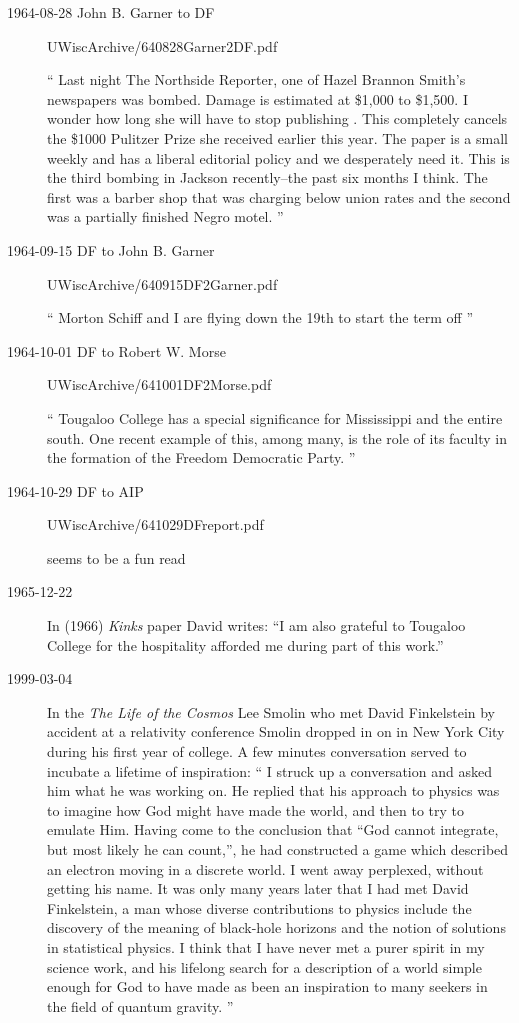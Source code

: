 \begin{description}
\item[1964-08-28 John B. Garner to DF] UWiscArchive/640828Garner2DF.pdf

``
Last night The Northside Reporter, one of Hazel Brannon Smith's newspapers
was bombed. Damage is estimated at \$1,000 to \$1,500. I wonder how long she
will have to stop publishing . This completely cancels the \$1000 Pulitzer
Prize she received earlier this year. The paper is a small weekly and has a
liberal editorial policy and we desperately need it. This is the third
bombing in Jackson recently--the past six months I think. The first was a
barber shop that was charging below union rates and the second was a
partially finished Negro motel.
''

\item[1964-09-15  DF to John B. Garner] UWiscArchive/640915DF2Garner.pdf

``
Morton Schiff and I are flying down the 19th to start the term off
''

\item[1964-10-01  DF to Robert W. Morse] UWiscArchive/641001DF2Morse.pdf

``
Tougaloo College has a special significance for Mississippi and the entire
south. One recent example of this, among many, is the role of its faculty in
the formation of the Freedom Democratic Party.
''


\item[1964-10-29  DF to AIP] UWiscArchive/641029DFreport.pdf

seems to be a fun read

\item[1965-12-22]
In (1966) {\em Kinks} paper David writes: ``I am also grateful
to Tougaloo College for the hospitality afforded me during part of this
work.''


\item[1999-03-04] In the {\em The Life of the Cosmos} Lee Smolin
who met David Finkelstein by accident at a relativity conference
Smolin dropped in on in New York City during his first year of college. A few
minutes conversation served to incubate a lifetime of inspiration: ``
I struck up a conversation and asked him what he was working on. He replied that his
approach to physics was to imagine how God might have made the world, and then
to try to emulate Him. Having come to the conclusion that ``God cannot integrate, but
most likely he can count,'', he had constructed a game which described an electron
moving in a discrete world. I went away perplexed, without getting his name. It was
only many years later that I had met David Finkelstein, a man whose diverse contributions
to physics include the discovery of the meaning of black-hole horizons and the
notion of solutions in statistical physics. I think that I have never met a purer spirit in
my science work, and his lifelong search for a description of a world simple enough
for God to have made as been an inspiration to many seekers in the field of quantum
gravity.
''


\end{description}
